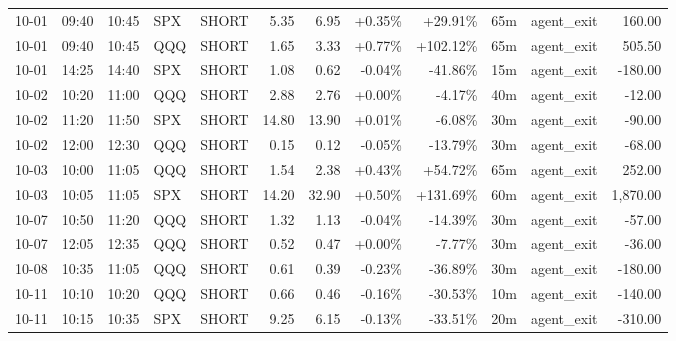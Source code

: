 \documentclass[11pt,a4paper,twoside]{article}
\begin{document}
\begin{center}
\begin{longtable}{>{\color{txtmain}}l l l l l r r r r r >{\color{txtmain}}l r}
10-01 & 09:40 & 10:45 & SPX & SHORT & 5.35 & 6.95 & \textcolor{wingreen}{+0.35\%} & \textcolor{wingreen}{+29.91\%} & 65m & agent\_exit & \textcolor{wingreen}{160.00} \\
10-01 & 09:40 & 10:45 & QQQ & SHORT & 1.65 & 3.33 & \textcolor{wingreen}{+0.77\%} & \textcolor{wingreen}{+102.12\%} & 65m & agent\_exit & \textcolor{wingreen}{505.50} \\
10-01 & 14:25 & 14:40 & SPX & SHORT & 1.08 & 0.62 & \textcolor{lossred}{-0.04\%} & \textcolor{lossred}{-41.86\%} & 15m & agent\_exit & \textcolor{lossred}{-180.00} \\
10-02 & 10:20 & 11:00 & QQQ & SHORT & 2.88 & 2.76 & \textcolor{wingreen}{+0.00\%} & \textcolor{lossred}{-4.17\%} & 40m & agent\_exit & \textcolor{lossred}{-12.00} \\
10-02 & 11:20 & 11:50 & SPX & SHORT & 14.80 & 13.90 & \textcolor{wingreen}{+0.01\%} & \textcolor{lossred}{-6.08\%} & 30m & agent\_exit & \textcolor{lossred}{-90.00} \\
10-02 & 12:00 & 12:30 & QQQ & SHORT & 0.15 & 0.12 & \textcolor{lossred}{-0.05\%} & \textcolor{lossred}{-13.79\%} & 30m & agent\_exit & \textcolor{lossred}{-68.00} \\
10-03 & 10:00 & 11:05 & QQQ & SHORT & 1.54 & 2.38 & \textcolor{wingreen}{+0.43\%} & \textcolor{wingreen}{+54.72\%} & 65m & agent\_exit & \textcolor{wingreen}{252.00} \\
10-03 & 10:05 & 11:05 & SPX & SHORT & 14.20 & 32.90 & \textcolor{wingreen}{+0.50\%} & \textcolor{wingreen}{+131.69\%} & 60m & agent\_exit & \textcolor{wingreen}{1,870.00} \\
10-07 & 10:50 & 11:20 & QQQ & SHORT & 1.32 & 1.13 & \textcolor{lossred}{-0.04\%} & \textcolor{lossred}{-14.39\%} & 30m & agent\_exit & \textcolor{lossred}{-57.00} \\
10-07 & 12:05 & 12:35 & QQQ & SHORT & 0.52 & 0.47 & \textcolor{wingreen}{+0.00\%} & \textcolor{lossred}{-7.77\%} & 30m & agent\_exit & \textcolor{lossred}{-36.00} \\
10-08 & 10:35 & 11:05 & QQQ & SHORT & 0.61 & 0.39 & \textcolor{lossred}{-0.23\%} & \textcolor{lossred}{-36.89\%} & 30m & agent\_exit & \textcolor{lossred}{-180.00} \\
10-11 & 10:10 & 10:20 & QQQ & SHORT & 0.66 & 0.46 & \textcolor{lossred}{-0.16\%} & \textcolor{lossred}{-30.53\%} & 10m & agent\_exit & \textcolor{lossred}{-140.00} \\
10-11 & 10:15 & 10:35 & SPX & SHORT & 9.25 & 6.15 & \textcolor{lossred}{-0.13\%} & \textcolor{lossred}{-33.51\%} & 20m & agent\_exit & \textcolor{lossred}{-310.00} \\

\end{longtable}
\end{center}
\end{document}
